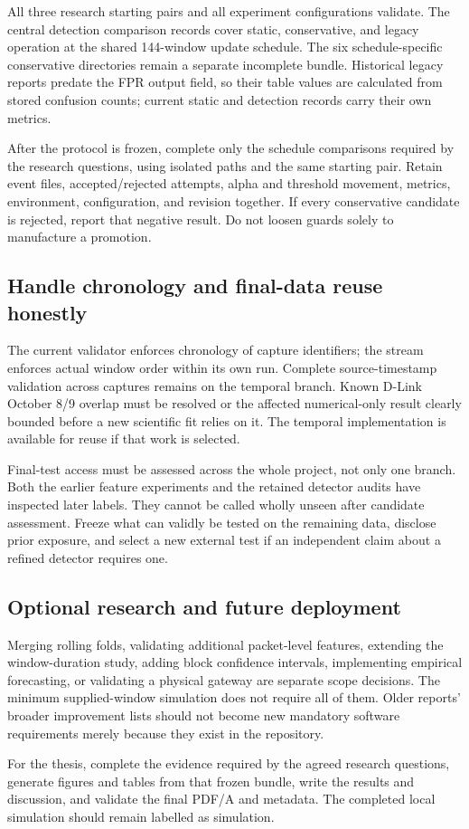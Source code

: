 All three research starting pairs and all experiment configurations validate.
The central detection comparison records cover static, conservative, and legacy
operation at the shared 144-window update schedule. The six schedule-specific
conservative directories remain a separate incomplete bundle. Historical legacy
reports predate the FPR output field, so their table values are calculated from
stored confusion counts; current static and detection records carry their own
metrics.

After the protocol is frozen, complete only the schedule comparisons required
by the research questions, using isolated paths and the same starting pair.
Retain event files, accepted/rejected attempts,
alpha and threshold movement, metrics, environment, configuration, and
revision together. If every conservative candidate is rejected, report that
negative result. Do not loosen guards solely to manufacture a promotion.

\subsection{Handle chronology and final-data reuse honestly}

The current validator enforces chronology of capture identifiers; the stream
enforces actual window order within its own run. Complete source-timestamp
validation across captures remains on the temporal branch. Known D-Link
October 8/9 overlap must be resolved or the affected numerical-only result
clearly bounded before a new scientific fit relies on it.
The temporal implementation is available for reuse if that work is selected.

Final-test access must be assessed across the whole project, not only one
branch. Both the earlier feature experiments and the retained detector audits
have inspected later labels. They cannot be called wholly unseen after
candidate assessment. Freeze what can validly be tested on the remaining
data, disclose prior exposure, and select a new external test if an independent
claim about a refined detector requires one.

\subsection{Optional research and future deployment}

Merging rolling folds, validating additional packet-level features, extending
the window-duration study, adding block confidence intervals, implementing empirical
forecasting, or validating a physical gateway are separate scope decisions.
The minimum supplied-window simulation does not require all of them.
Older reports' broader improvement lists should not become new mandatory
software requirements merely because they exist in the repository.

For the thesis, complete the evidence required by the agreed research
questions, generate figures and tables from that frozen bundle, write the
results and discussion, and validate the final PDF/A and metadata.
The completed local simulation should remain labelled as simulation.

